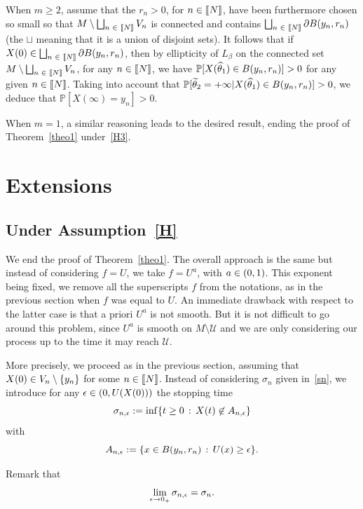 \documentclass[10pt]{amsart}
\theoremstyle{definition}\newtheorem{defi}[theo]{Definition}\newtheorem{rema}[theo]{Remark}\newtheorem{exam}[theo]{Example}\newtheorem{exem}[theo]{Example}\newtheorem{nota}[theo]{Notation}
\newcommand{\cU}{\mathcal{U}}
\newcommand{\PP}{\mathbb{P}}
\newcommand{\iy}{\infty}
\newcommand{\pa}{\partial}
\newcommand{\wi}{\widetilde}
\newcommand{\wit}{\widehat}
\let\oldin\in
\renewcommand{\in}{\mathchoice{\oldin}{\oldin}{\,\oldin\,}{\,\oldin\,}}
\renewcommand*{\to}{\mathchoice{\longrightarrow}{\rightarrow}{\rightarrow}{\rightarrow}}
\newcommand{\llbracket}{\mathopen{[\mkern -2.7mu[}}
\newcommand{\rrbracket}{\mathclose{]\mkern -2.7mu]}}
\newcommand{\lin}{\llbracket}
\newcommand{\rin}{\rrbracket}
\begin{document}
When $m\geq 2$, assume that the $r_n>0$, for $n\in\lin N\rin$, have been furthermore chosen so small so that $M\setminus \bigsqcup_{n\in\lin N\rin} V_n$ is connected and contains $\bigsqcup_{n\in\lin N\rin}\pa B(y_n,r_n)$ (the $\sqcup$ meaning that it is a union of disjoint sets). It follows that if $X(0)\in \bigsqcup_{n\in\lin N\rin}\pa B(y_n,r_n)$, then by ellipticity of $L_\beta$ on the connected set $M\setminus \bigsqcup_{n\in\lin N\rin} V_n$, for any $n\in\lin N\rin$, we have $\PP[X(\wit\theta_1)\in B(y_n,r_n)]>0$ for any given $n\in\lin N\rin$. Taking into account that $\PP[\wi\theta_2=+\iy\vert X(\wit\theta_1)\in B(y_n,r_n)]>0$, we deduce that $\PP[X(\iy)=y_n]>0$.


When $m=1$, a similar reasoning leads to the desired result, ending the proof of Theorem~\ref{theo1} under~\eqref{H3}.


\section{Extensions}\label{e}

\subsection{Under Assumption~\eqref{H}}

We end the proof of Theorem~\ref{theo1}. The overall approach is the same but instead of considering $f=U$, we take $f=U^a$, with $a\in (0,1)$. This exponent being fixed, we remove all the superscripts $f$ from the notations, as in the previous section when $f$ was equal to $U$. An immediate drawback with respect to the latter case is that a priori $U^a$ is not smooth. But it is not difficult to go around this problem, since $U^a$ is smooth on $M\setminus\cU$ and we are only considering our process up to the time it may reach $\cU$.


More precisely, we proceed as in the previous section, assuming that $X(0)\in V_n\setminus\{y_n\}$ for some $n\in\lin N\rin$. Instead of considering $\sigma_n$ given in~\eqref{sn}, we introduce for any $\epsilon\in(0,U(X(0)))$ the stopping time
\begin{equation*}
\sigma_{n,\epsilon} := \inf\{t\geq 0\,:\, X(t)\not\in A_{n,\epsilon}\}
\end{equation*}
with
\begin{equation*} 
A_{n,\epsilon}:= \{x\in B(y_n,r_n)\,:\, U(x)\geq \epsilon\}.
\end{equation*}


Remark that
\begin{equation*}
\lim_{\epsilon\to 0_+} \sigma_{n,\epsilon} = \sigma_n.
\end{equation*}
\end{document}
